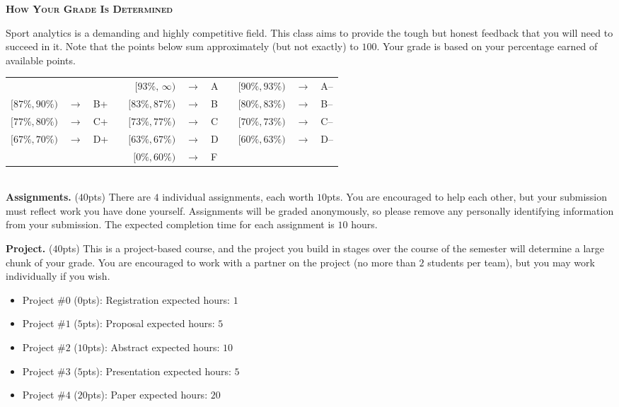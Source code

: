 \documentclass[11pt]{article}
\begin{document}
\newpage
\textbf{\textsc{How Your Grade Is Determined}}
\begin{adjustwidth}{1cm}{0cm}
	Sport analytics is a demanding and highly competitive field. This class aims to provide the tough but honest feedback that you will need to succeed in it. Note that the points below sum approximately (but not exactly) to $100$. Your grade is based on your percentage earned of available points.
  \begin{center}
    \begin{tabular}{rclcrclcrcl}
                      &               &     & & $[93\%,\,\infty)$ & $\rightarrow$ & A & & $[90\%, 93\%)$ & $\rightarrow$	& A--\\
      $[87\%, 90\%)$  & $\rightarrow$	& B+  & & $[83\%, 87\%)$  & $\rightarrow$ & B & & $[80\%, 83\%)$ & $\rightarrow$	& B--\\
      $[77\%, 80\%)$  & $\rightarrow$	& C+  & & $[73\%, 77\%)$  & $\rightarrow$ & C & & $[70\%, 73\%)$ & $\rightarrow$	& C--\\
      $[67\%, 70\%)$  & $\rightarrow$	& D+  & & $[63\%, 67\%)$  & $\rightarrow$ & D & & $[60\%, 63\%)$ & $\rightarrow$  & D--\\
                      &               &     & & $[ 0\%, 60\%)$  & $\rightarrow$ & F\\
    \end{tabular}
  \end{center}
  ~\\
	\textbf{Assignments.} ($40$pts) There are $4$ individual assignments, each worth $10$pts. You are encouraged to help each other, but your submission must reflect work you have done yourself. Assignments will be graded anonymously, so please remove any personally identifying information from your submission. The expected completion time for each assignment is $10$ hours.

  \textbf{Project.} ($40$pts) This is a project-based course, and the project you build in stages over the course of the semester will determine a large chunk of your grade. You are encouraged to work with a partner on the project (no more than $2$ students per team), but you may work individually if you wish.
  \begin{itemize}
    \item Project \#$0$ ($0$pts): Registration                   \hfill expected hours: $1$
    \item Project \#$1$ ($5$pts): Proposal                       \hfill expected hours: $5$
    \item Project \#$2$ ($10$pts): Abstract                      \hfill expected hours: $10$
    \item Project \#$3$ ($5$pts): Presentation                   \hfill expected hours: $5$
    \item Project \#$4$ ($20$pts): Paper                         \hfill expected hours: $20$
  \end{itemize}


\end{adjustwidth}
\end{document}
